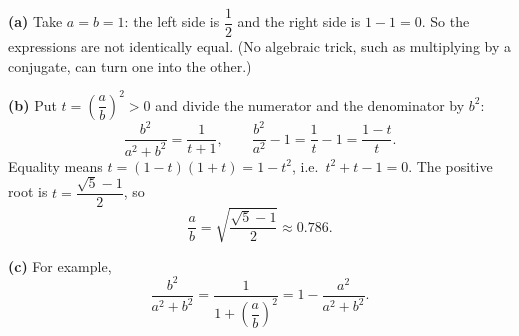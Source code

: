 \textbf{(a)} Take $a=b=1$: the left side is $\dfrac{1}{2}$ and the right side is $1-1=0$. So the expressions are not identically equal. (No algebraic trick, such as multiplying by a conjugate, can turn one into the other.)

\textbf{(b)} Put $t=\left(\dfrac {a}{b}\right)^2>0$ and divide the numerator and the denominator by $b^2$:
\[
\dfrac{b^2}{a^2+b^2}=\dfrac{1}{t+1},\qquad \dfrac{b^2}{a^2}-1=\dfrac{1}{t}-1=\dfrac{1-t}{t}.
\]
Equality means $t=(1-t)(1+t)=1-t^2$, i.e.\ $t^2+t-1=0$. The positive root is $t=\dfrac{\sqrt5-1}{2}$, so
\[
\boxed{\dfrac {a}{b}=\sqrt{\dfrac{\sqrt5-1}{2}}}\approx0.786 .
\]

\textbf{(c)} For example,
\[
\dfrac{b^2}{a^2+b^2}=\dfrac{1}{1+\left(\dfrac {a}{b}\right)^2}=1-\dfrac{a^2}{a^2+b^2}.
\]
